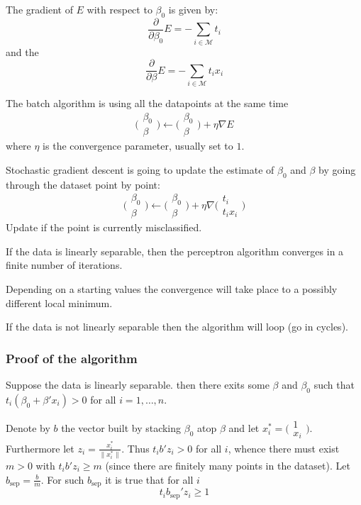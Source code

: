 \documentclass[a4paper]{article}
\newcommand{\Mcal}{\mathcal{M}}
\begin{document}
The gradient of $E$ with respect to $\beta_0$ is given by:
\[\frac{\partial}{\partial \beta_0} E = - \sum_{i\in \Mcal} t_i\]
and the 
\[\frac{\partial}{\partial \beta} E = - \sum_{i\in \Mcal} t_i x_i \]

The batch algorithm is using all the datapoints at the same time
\[
\bigl(\begin{smallmatrix} \beta_0\\ \beta \end{smallmatrix}\bigr)
\leftarrow \bigl(\begin{smallmatrix} \beta_0\\ \beta \end{smallmatrix}\bigr)
+\eta \nabla E
\]
where $\eta$ is the convergence parameter, usually set to $1$.

Stochastic gradient descent is going to update the estimate of $\beta_0$ and $\beta$ 
by going through the dataset point by point:
\[
\bigl(\begin{smallmatrix} \beta_0\\ \beta \end{smallmatrix}\bigr)
\leftarrow \bigl(\begin{smallmatrix} \beta_0\\ \beta \end{smallmatrix}\bigr)
+\eta \nabla \bigl(\begin{smallmatrix} t_i\\ t_i x_i \end{smallmatrix}\bigr)
\]
Update if the point is currently misclassified.

If the data is linearly separable, then the perceptron algorithm converges in a finite
number of iterations.

Depending on a starting values the convergence will take place to a possibly different local minimum.

If the data is not linearly separable then the algorithm will loop (go in cycles).


\subsubsection{Proof of the algorithm} %
\label{ssub:proof_of_the_algorithm}
Suppose the data is linearly separable. then there exits some $\beta$ and $\beta_0$
such that $t_i ( \beta_0 + \beta'x_i) > 0$ for all $i=1,\ldots, n$.

Denote by $b$ the vector built by stacking $\beta_0$ atop $\beta$ and let
$x_i^* = \bigl(\begin{smallmatrix} 1\\ x_i \end{smallmatrix}\bigr)$. Furthermore let
$z_i = \frac{x_i^*}{\|x_i^*\|}$. Thus $t_i b'z_i > 0 $ for all $i$, whence there must
exist $m>0$ with $t_ib'z_i \geq m$ (since there are finitely many points in the dataset).
Let $b_\text{sep} = \frac{b}{m}$. For such $b_\text{sep}$ it is true that for all $i$
\[t_i b_\text{sep}' z_i \geq 1\]
\end{document}
